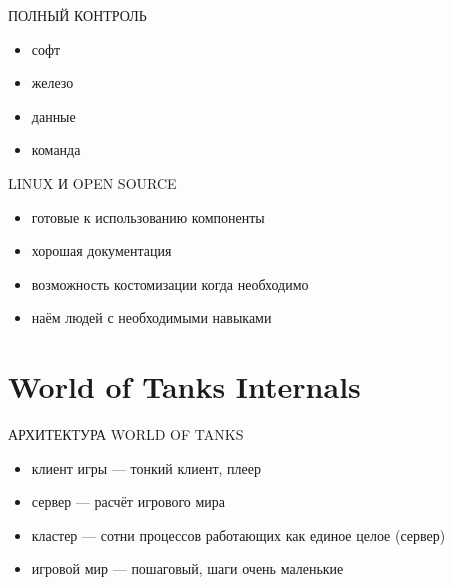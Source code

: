 \documentclass[aspectratio=169]{beamer}
\begin{document}
\begin{frame}{ПОЛНЫЙ КОНТРОЛЬ}
    \begin{itemize}
        \item софт
        \item железо
        \item данные
        \item команда
    \end{itemize}
\end{frame}

\begin{frame}{LINUX И OPEN SOURCE}
    \begin{itemize}
        \item готовые к использованию компоненты
        \item хорошая документация
        \item возможность костомизации когда необходимо
        \item наём людей с необходимыми навыками
    \end{itemize}
\end{frame}

\section{World of Tanks Internals}
{
\begin{frame}[plain]{}
\end{frame}
}

\begin{frame}{АРХИТЕКТУРА WORLD OF TANKS}
    \begin{itemize}
        \item клиент игры --- тонкий клиент, плеер
        \item сервер --- расчёт игрового мира
        \item кластер --- сотни процессов работающих как единое целое (сервер)
        \item игровой мир --- пошаговый, шаги очень маленькие
    \end{itemize}
\end{frame}
\end{document}
